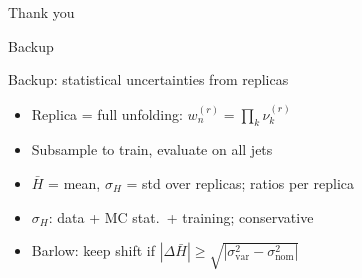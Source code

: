 \documentclass[10pt, aspectratio=169]{beamer}
\begin{document}

\begin{frame}
	\centering
	\vfill
	{\Huge\color{PrimaryColor} Thank you}\\[6mm]
	\vfill
\end{frame}

\appendix

\begin{frame}
	\centering\Huge\color{PrimaryColor} Backup
\end{frame}

\begin{frame}{Backup: statistical uncertainties from replicas}
	\begin{itemize}
		\item Replica = full unfolding: \(w^{(r)}_n = \prod_k \nu^{(r)}_k\)
		\item Subsample to train, evaluate on all jets
		\item \(\bar H\) = mean, \(\sigma_H\) = std over replicas; ratios per replica
		\item \(\sigma_H\): data + MC stat.\ + training; conservative
		\item Barlow: keep shift if \(|\Delta \bar H| \geq \sqrt{|\sigma^2_\mathrm{var} - \sigma^2_\mathrm{nom}|}\)
	\end{itemize}
\end{frame}
\end{document}
